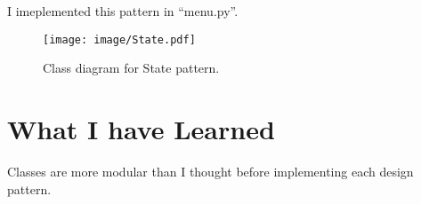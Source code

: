 \documentclass[11pt]{article}
\begin{document}
I imeplemented this pattern in ``menu.py''.

\begin{figure}[htb]
 \centering
     {\texttt{[image: image/State.pdf]}}
    \vspace{-2ex}
     \caption{\label{fig:state}  
        Class diagram for State pattern.
     }
\end{figure}



\section{What I have Learned}
Classes are more modular than I thought before implementing each design pattern. 
\end{document}
